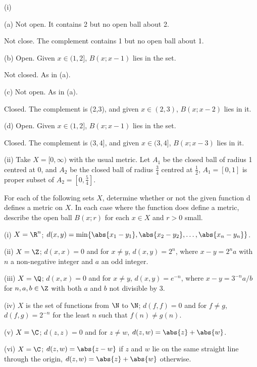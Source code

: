 \begin{solution}[\bf Solution.]\ben
\item [(i)] \ben 
\item [(a)] Not open. It contains 2 but no open ball about 2.

Not close. The complement contains 1 but no open ball about 1.

\item [(b)] Open. Given $x\in(1,2]$, $B(x;x-1)$ lies in the set.

Not closed. As in (a).

\item [(c)] Not open. As in (a).

Closed. The complement is (2,3), and given $x\in (2,3)$, $B(x;x-2)$ lies in it.

\item [(d)] Open. Given $x\in (1,2]$, $B(x;x-1)$ lies in the set. 

Closed. The complement is $(3,4]$, and given $x\in(3,4]$, $B(x;x-3)$ lies in it.
\een
\item [(ii)] Take $X=[0,\infty)$ with the usual metric. Let $A_1$ be the closed ball of radius 1 centred at 0, and $A_2$ be the closed ball of radius $\tfrac 34$ centred at $\frac 12$, $A_1=[0,1]$ is proper subset of $A_2 = [0,\frac 54]$.
\een



\end{solution}

\begin{problem}\label{ques:open_ball} For each of the following sets $X$, determine whether or not the given function d defines a metric on $X$. In each case where the function does define a metric, describe the open ball $B(x;r)$ for each $x \in X$ and $r > 0$ small.
\ben
\item [(i)] $X = \R^n$; $d(x, y) = \min\{\abs{x_1 -y_1}, \abs{x_2 - y_2},\dots,\abs{x_n - y_n}\}$.
\item [(ii)] $X = \Z$; $d(x, x) = 0$ and for $x \neq y$, $d(x, y) = 2^n$, where $x - y = 2^n a$ with $n$ a non-negative integer and $a$ an odd integer.
\item [(iii)] $X = \Q$; $d(x, x) = 0$ and for $x \neq y$, $d(x, y) = e^{-n}$, where $x - y = 3^{-n}a/b$ for $n, a, b \in \Z$ with both $a$ and $b$ not divisible by 3.
\item [(iv)] $X$ is the set of functions from $\N$ to $\N$; $d(f, f) = 0$ and for $f \neq g$, $d(f, g) = 2^{-n}$ for the least $n$ such that $f(n) \neq g(n)$.
\item [(v)] $X = \C$; $d(z, z) = 0$ and for $z \neq w$, $d(z,w) = \abs{z} + \abs{w}$.
\item [(vi)] $X = \C$; $d(z,w) = \abs{z - w}$ if $z$ and $w$ lie on the same straight line through the origin, $d(z,w) = \abs{z} + \abs{w}$ otherwise.
\een



\end{problem}

